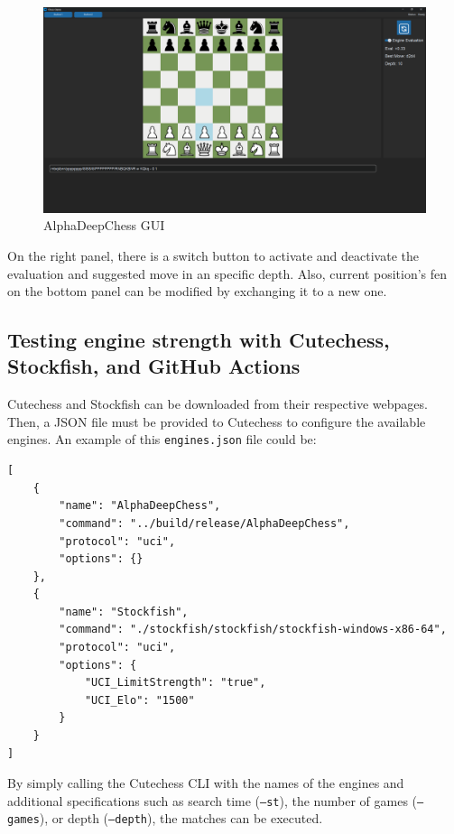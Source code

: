 \begin{figure}[H]
    \centering
    \includegraphics[width=\textwidth]{Imagenes/gui.png}
    \caption{AlphaDeepChess GUI}
    \label{fig:gui}
\end{figure}

On the right panel, there is a switch button to activate and deactivate the evaluation and suggested move in an specific depth. Also, current position's fen on the bottom panel can be modified by exchanging it to a new one.

\subsection{Testing engine strength with Cutechess, Stockfish, and GitHub Actions}

Cutechess and Stockfish can be downloaded from their respective webpages. Then, a JSON file must be provided to Cutechess to configure the available engines. An example of this \texttt{engines.json} file could be:

\vspace{1em}

\begin{lstlisting}[breaklines=true, frame=single]
[
    {
        "name": "AlphaDeepChess",
        "command": "../build/release/AlphaDeepChess",
        "protocol": "uci",
        "options": {}
    },
    {
        "name": "Stockfish",
        "command": "./stockfish/stockfish/stockfish-windows-x86-64",
        "protocol": "uci",
        "options": {
            "UCI_LimitStrength": "true",
            "UCI_Elo": "1500"
        }
    }
]
\end{lstlisting}

\noindent By simply calling the Cutechess CLI with the names of the engines and additional specifications such as search time (\texttt{--st}), the number of games (\texttt{--games}), or depth (\texttt{--depth}), the matches can be executed.

